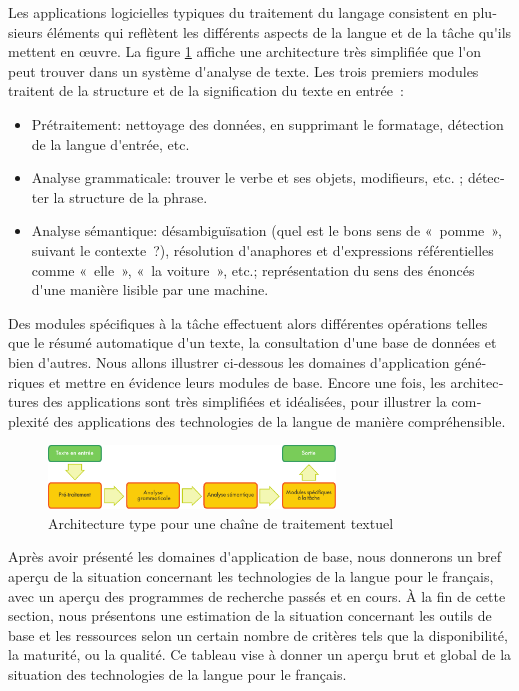 \begin{french}
\begin{multicols}{2}
Les applications logicielles typiques du traitement du langage
consistent en plusieurs éléments qui reflètent les différents aspects
de la langue et de la tâche qu{\mbox '}ils mettent en œuvre. La figure \ref{fig:textprocarchi}  
 affiche une architecture très simplifiée que l{\mbox '}on peut trouver
dans un système d{\mbox '}analyse de texte. Les trois premiers modules
traitent de la structure et de la signification du texte en entrée~:
\begin{itemize}
\item Prétraitement: nettoyage des données, en supprimant le
  formatage, détection de la langue d{\mbox '}entrée, etc.

\item Analyse grammaticale: trouver le verbe et ses objets,
  modifieurs, etc. ; détecter la structure de la phrase.

\item Analyse sémantique: désambiguïsation (quel est le bons sens de
  «~pomme~», suivant le contexte~?), résolution d{\mbox '}anaphores et
  d{\mbox '}expressions référentielles comme «~elle~», «~la voiture~», etc.;
  représentation du sens des énoncés d{\mbox '}une manière lisible par une
  machine.
\end{itemize}

Des modules spécifiques à la tâche effectuent alors différentes
opérations telles que le résumé automatique d{\mbox '}un texte, la
consultation d{\mbox '}une base de données et bien d{\mbox '}autres. Nous allons
illustrer ci-dessous les domaines d{\mbox '}application génériques et mettre
en évidence leurs modules de base. Encore une fois, les architectures
des applications sont très simplifiées et idéalisées, pour illustrer
la complexité des applications des technologies de la langue de
manière compréhensible.

\begin{figure}[!ht]
\begin{center}
 \includegraphics[width=3.0in]{../_media/french/text_processing_app_architecture}
\caption{Architecture type pour une chaîne de traitement textuel}
\label{fig:textprocarchi}
\end{center}
\end{figure}

Après avoir présenté les domaines d{\mbox '}application de base, nous
donnerons un bref aperçu de la situation concernant les technologies
de la langue pour le français, avec un aperçu des programmes de
recherche passés et en cours. À la fin de cette section, nous
présentons une estimation de la situation concernant les outils de
base et les ressources selon un certain nombre de critères tels que la
disponibilité, la maturité, ou la qualité. Ce tableau vise à donner un
aperçu brut et global de la situation des technologies de la langue
pour le français.


\end{multicols}
\end{french}
